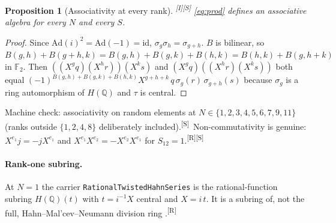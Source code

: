 \documentclass[11pt,a4paper]{article}
\newtheorem{proposition}[theorem]{Proposition}
\theoremstyle{definition}
\theoremstyle{remark}
\newcommand{\F}{\mathbb{F}}
\newcommand{\HQ}{H(\mathbb{Q})}
\newcommand{\code}[1]{\texttt{#1}}
\newcommand{\tR}{\textsuperscript{[R]}}
\newcommand{\tS}{\textsuperscript{[S]}}
\newcommand{\tI}{\textsuperscript{[I]}}
\begin{document}
\begin{proposition}[Associativity at every rank]\label{prop:assoc}\tI\tS
\eqref{eq:prod} defines an associative algebra for every $N$ and every $S$.
\end{proposition}
\begin{proof}
Since $\mathrm{Ad}(i)^2=\mathrm{Ad}(-1)=\mathrm{id}$, $\sigma_g\sigma_h=\sigma_{g+h}$. $B$ is bilinear, so $B(g,h)+B(g+h,k)=B(g,h)+B(g,k)+B(h,k)=B(h,k)+B(g,h+k)$ in $\F_2$. Then $((X^gq)(X^hr))(X^ks)$ and $(X^gq)((X^hr)(X^ks))$ both equal $(-1)^{B(g,h)+B(g,k)+B(h,k)}X^{g+h+k}\,q\,\sigma_g(r)\,\sigma_{g+h}(s)$ because $\sigma_g$ is a ring automorphism of $\HQ$ and $\tau$ is central.
\end{proof}
\noindent Machine check: associativity on random elements at $N\in\{1,2,3,4,5,6,7,9,11\}$ (ranks outside $\{1,2,4,8\}$ deliberately included).\tS\ Non-commutativity is genuine: $X^{e_1}j=-jX^{e_1}$ and $X^{e_1}X^{e_2}=-X^{e_2}X^{e_1}$ for $S_{12}=1$.\tR\tS

\paragraph{Rank-one subring.} At $N=1$ the carrier \code{RationalTwistedHahnSeries} is the rational-function subring $\HQ(t)$ with $t=i^{-1}X$ central and $X=i\,t$. It is a subring of, not the full, Hahn--Mal'cev--Neumann division ring \cite{Malcev,Neumann}.\tR
\end{document}
